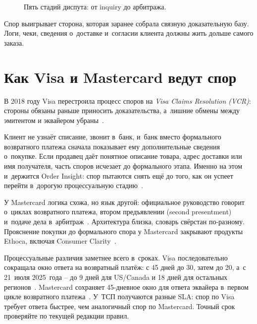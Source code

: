 \begin{figure}[tbp]
  \centering
  \caption{Пять стадий диспута: от inquiry до арбитража.}\label{fig:dispute-lifecycle}
\end{figure}

Спор выигрывает сторона, которая заранее собрала связную доказательную
базу. Логи, чеки, сведения о~доставке и~согласии клиента должны жить
дольше самого заказа.

\section{Как Visa и Mastercard ведут спор}\label{sec:disputes-vcr-mc}

В 2018 году Visa перестроила процесс споров на \emph{Visa Claims
Resolution (VCR)}: стороны обязаны раньше приносить доказательства,
а~лишние обмены между эмитентом и эквайером убраны~\cite{visa-vcr-merchants,visa-core-rules}.

Клиент не узнаёт
списание, звонит в~банк, и~банк вместо формального возвратного платежа сначала
показывает ему дополнительные сведения о~покупке. Если продавец даёт
понятное описание товара, адрес доставки или имя получателя, часть
споров исчезает до формального этапа. Именно на этом и~держится
Order Insight: спор пытаются снять ещё до того, как он успеет перейти
в~дорогую процессуальную стадию~\cite{visa-order-insight}.

У Mastercard логика схожа, но язык другой: официальное
руководство говорит о~циклах возвратного платежа, втором предъявлении
(second presentment) и~подаче
дела в~арбитраж~\cite{mc-chargeback-guide}. Архитектура близка, словарь свёрстан по-разному.
Прояснение покупки до формального спора у Mastercard
закрывают продукты Ethoca, включая Consumer
Clarity~\cite{mc-dispute-management}.

Процессуальные различия заметнее всего в~сроках. Visa
последовательно сокращала окно ответа на возвратный платёж: с 45 дней
до 30, затем до 20, а~с 21~июля 2025~года -- до 9 дней для
US/Canada и 18 дней для остальных регионов~\cite{visa-core-rules}.
Mastercard сохраняет 45-дневное окно для ответа эквайера
в~первом цикле возвратного платежа~\cite{mc-chargeback-guide}. У~ТСП
получаются разные SLA: спор по Visa требует
ответа быстрее, чем аналогичный спор по Mastercard. Точный
срок проверяйте по текущей редакции правил.

